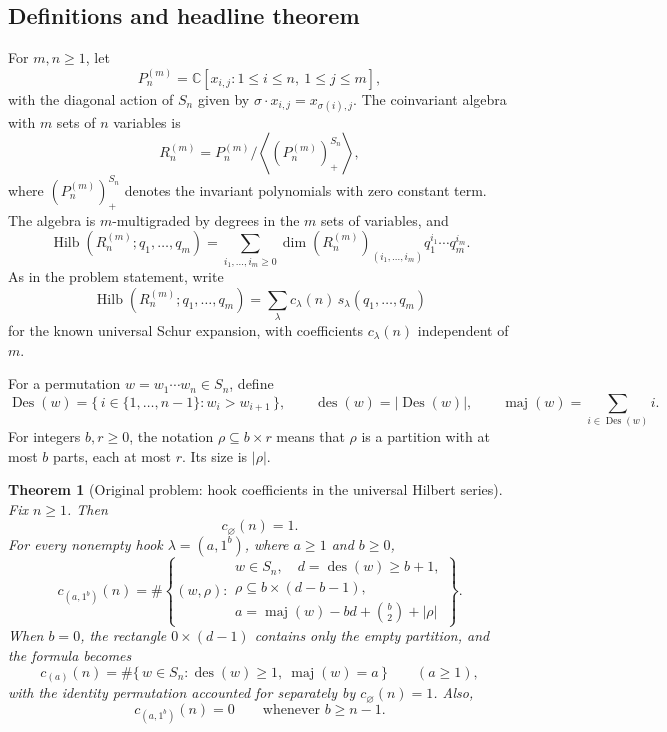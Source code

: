 \documentclass[12pt]{article}
\newtheorem{theorem}{Theorem}
\DeclareMathOperator{\Hilb}{Hilb}
\DeclareMathOperator{\Des}{Des}
\DeclareMathOperator{\des}{des}
\DeclareMathOperator{\maj}{maj}
\begin{document}
\subsection{Definitions and headline theorem}

For \(m,n\ge 1\), let
\[
P_n^{(m)}=\mathbb C[x_{i,j}:1\le i\le n,\ 1\le j\le m],
\]
with the diagonal action of \(S_n\) given by \(\sigma\cdot x_{i,j}=x_{\sigma(i),j}\).  The coinvariant algebra with \(m\) sets of \(n\) variables is
\[
R_n^{(m)}
=
P_n^{(m)}\big/
\left\langle \left(P_n^{(m)}\right)^{S_n}_{+}\right\rangle,
\]
where \(\left(P_n^{(m)}\right)^{S_n}_{+}\) denotes the invariant polynomials with zero constant term.  The algebra is \(m\)-multigraded by degrees in the \(m\) sets of variables, and
\[
\Hilb(R_n^{(m)};q_1,\ldots,q_m)
=
\sum_{i_1,\ldots,i_m\ge 0}
\dim\!\left(R_n^{(m)}\right)_{(i_1,\ldots,i_m)}
q_1^{i_1}\cdots q_m^{i_m}.
\]
As in the problem statement, write
\[
\Hilb(R_n^{(m)};q_1,\ldots,q_m)
=
\sum_{\lambda} c_\lambda(n)\,s_\lambda(q_1,\ldots,q_m)
\]
for the known universal Schur expansion, with coefficients \(c_\lambda(n)\) independent of \(m\).

For a permutation \(w=w_1\cdots w_n\in S_n\), define
\[
\Des(w)=\{\,i\in\{1,\ldots,n-1\}:w_i>w_{i+1}\,\},
\qquad
\des(w)=|\Des(w)|,
\qquad
\maj(w)=\sum_{i\in\Des(w)}i.
\]
For integers \(b,r\ge 0\), the notation \(\rho\subseteq b\times r\) means that \(\rho\) is a partition with at most \(b\) parts, each at most \(r\).  Its size is \(|\rho|\).

\begin{theorem}[Original problem: hook coefficients in the universal Hilbert series]\label{thm:main}
Fix \(n\ge 1\).  Then
\[
c_{\varnothing}(n)=1.
\]
For every nonempty hook \(\lambda=(a,1^b)\), where \(a\ge 1\) and \(b\ge 0\),
\[
\boxed{
c_{(a,1^b)}(n)
=
\#\left\{
(w,\rho):
\begin{array}{l}
w\in S_n,\quad d=\des(w)\ge b+1,\\[2pt]
\rho\subseteq b\times(d-b-1),\\[2pt]
a=\maj(w)-bd+\binom{b}{2}+|\rho|
\end{array}
\right\}.
}
\]
When \(b=0\), the rectangle \(0\times(d-1)\) contains only the empty partition, and the formula becomes
\[
c_{(a)}(n)
=
\#\{\,w\in S_n:\des(w)\ge 1,\ \maj(w)=a\,\}
\qquad (a\ge 1),
\]
with the identity permutation accounted for separately by \(c_{\varnothing}(n)=1\).  Also,
\[
c_{(a,1^b)}(n)=0
\qquad\text{whenever } b\ge n-1.
\]
\end{theorem}
\end{document}
